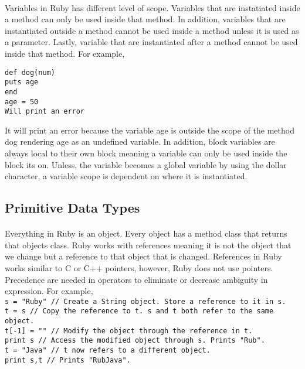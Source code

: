 \documentclass[11pt]{article}
\begin{document}
\paragraph{}
Variables in Ruby has different level of scope. Variables that are instatiated inside a method can only be used inside that method. In addition, variables that are instantiated outside a method cannot be used inside a method unless it is used as a parameter. Lastly, variable that are instantiated after a method cannot be used inside that method. For example, 
\begin{center}
 \texttt{def dog(num) \\ puts age \\ end \\  age = 50 \\  Will print an error} 
\end{center}
It will print an error because the variable age is outside the scope of the method dog rendering age as an undefined variable. In addition, block variables are always local to their own block meaning a variable can only be used inside the block its on. Unless, the variable becomes a global variable by using the dollar character, a variable scope is dependent on where it is instantiated.  
\subsection{Primitive Data Types}
\paragraph{}
Everything in Ruby is an object. Every object has a method class that returns that objects class. Ruby works with references meaning it is not the object that we change but a reference to that object that is changed.\cite{Wikipedia} References in Ruby works similar to C or C++ pointers, however, Ruby does not use pointers. Precedence are needed in operators to eliminate or decrease ambiguity in expression. For example, \\
\texttt{s = "Ruby"  // Create a String object. Store a reference to it in s.
	\\t = s // Copy the reference to t. s and t both refer to the same object.
	\\t[-1] = "" // Modify the object through the reference in t.
	\\print s // Access the modified object through s. Prints "Rub".
	\\t = "Java" // t now refers to a different object.
	\\print s,t // Prints "RubJava".} \cite{baba}
\newpage
\end{document}
